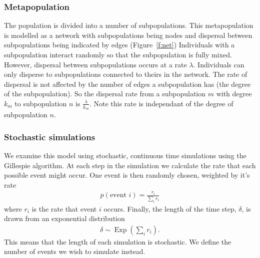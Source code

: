 \subsubsection{Metapopulation}

The population is divided into a number of subpopulations.
This metapopulation is modelled as a network with subpopulations being nodes and dispersal between subpopulations being indicated by edges (Figure~\ref{f:net})
Individuals with a subpopulation interact randomly so that the subpopulation is fully mixed.
However, dispersal between subpopulations occurs at a rate $\lambda$.
Individuals can only disperse to subpopulations connected to theirs in the network.
The rate of dispersal is not affected by the number of edges a subpopulation has (the degree of the subpopulation).
So the dispersal rate from a subpopulation $m$ with degree $k_m$ to subpopulation $n$ is $\frac{\lambda}{k_m}$.
Note this rate is independant of the degree of subpopulation $n$.


\subsubsection{Stochastic simulations}

We examine this model using stochastic, continuous time simulations using the Gillespie algorithm.
At each step in the simulation we calculate the rate that each possible event might occur.
One event is then randomly chosen, weighted by it's rate
\begin{align}
  p(\text{event } i) = \frac{r_i}{\sum_i r_i}
\end{align}
where $r_i$ is the rate that event $i$ occurs.
Finally, the length of the time step, $\delta$, is drawn from an exponential distribution 
\begin{align}
  \delta \sim \operatorname{Exp}\left(\sum_i r_i  \right).
\end{align}
This means that the length of each simulation is stochastic. 
We define the number of events we wish to simulate instead.

